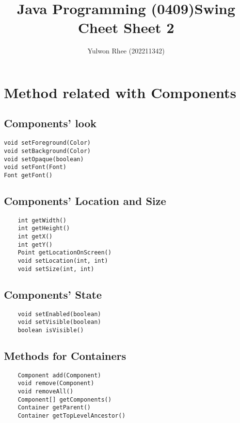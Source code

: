 



\title{Java Programming (0409)\newline\space Swing Cheet Sheet 2}
\author{Yulwon Rhee (202211342)}

\maketitle
{}
\section{Method related with Components}
\subsection{Components' look}
\begin{verbatim}
void setForeground(Color)
void setBackground(Color)
void setOpaque(boolean)
void setFont(Font)
Font getFont()
\end{verbatim}

\subsection{Components' Location and Size}
\begin{verbatim}
    int getWidth()
    int getHeight()
    int getX()
    int getY()
    Point getLocationOnScreen()
    void setLocation(int, int)
    void setSize(int, int)
\end{verbatim}

\subsection{Components' State}
\begin{verbatim}
    void setEnabled(boolean)
    void setVisible(boolean)
    boolean isVisible()
\end{verbatim}

\subsection{Methods for Containers}
\begin{verbatim}
    Component add(Component)
    void remove(Component)
    void removeAll()
    Component[] getComponents()
    Container getParent()
    Container getTopLevelAncestor()
\end{verbatim}

